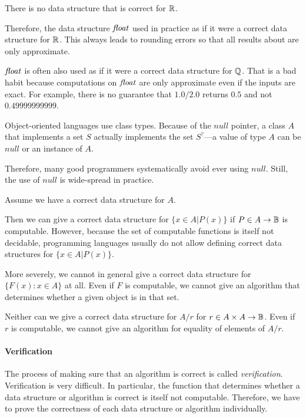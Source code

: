 \begin{example}
There is no data structure that is correct for $\mathbb{R}$.

Therefore, the data structure $\mathit{float}$ used in practice as if it were a correct data structure for $\mathbb{R}$.
This always leads to rounding errors so that all results about are only approximate.

$\mathit{float}$ is often also used as if it were a correct data structure for $\mathbb{Q}$.
That is a bad habit because computations on $\mathit{float}$ are only approximate even if the inputs are exact.
For example, there is no guarantee that $1.0/2.0$ returns $0.5$ and not $0.49999999999$.
\end{example}

\begin{example}
Object-oriented languages use class types.
Because of the $null$ pointer, a class $A$ that implements a set $S$ actually implements the set $S^?$---a value of type $A$ can be $null$ or an instance of $A$.

Therefore, many good programmers systematically avoid ever using $null$.
Still, the use of $null$ is wide-spread in practice.
\end{example}

\begin{example}
Assume we have a correct data structure for $A$.
\medskip

Then we can give a correct data structure for $\{x\in A|P(x)\}$ if $P\in A \to \mathbb{B}$ is computable.
However, because the set of computable functions is itself not decidable, programming languages usually do not allow defining correct data structures for $\{x\in A|P(x)\}$.

More severely, we cannot in general give a correct data structure for $\{F(x):x\in A\}$ at all.
Even if $F$ is computable, we cannot give an algorithm that determines whether a given object is in that set.

Neither can we give a correct data structure for $A/r$ for $r\in A\times A\to \mathbb{B}$.
Even if $r$ is computable, we cannot give an algorithm for equality of elements of $A/r$.
\end{example}

\paragraph{Verification}
The process of making sure that an algorithm is correct is called \emph{verification}.
Verification is very difficult.
In particular, the function that determines whether a data structure or algorithm is correct is itself not computable.
Therefore, we have to prove the correctness of each data structure or algorithm individually.

